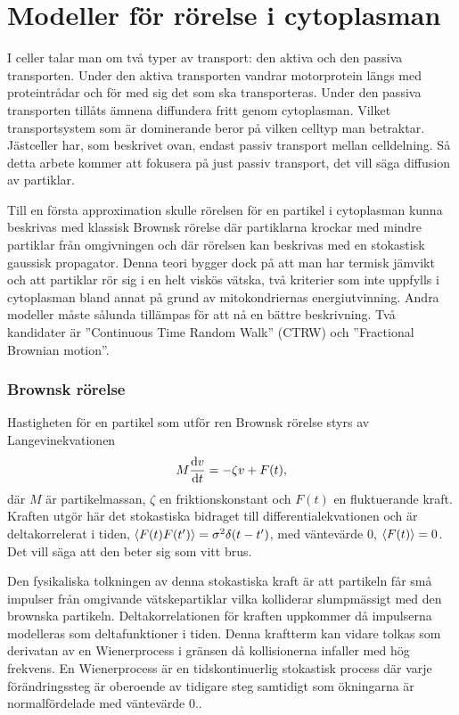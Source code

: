 \section{Modeller för rörelse i cytoplasman}
I celler talar man om två typer av transport: den aktiva och den
passiva transporten. Under den aktiva transporten vandrar motorprotein
längs med proteintrådar och för med sig det som ska transporteras.
Under den passiva transporten tillåts ämnena diffundera fritt genom
cytoplasman. Vilket transportsystem som är dominerande beror på vilken
celltyp man betraktar. Jästceller har, som beskrivet ovan, endast
passiv transport mellan celldelning. Så detta arbete kommer att
fokusera på just passiv transport, det vill säga diffusion av partiklar. 

Till en första approximation skulle rörelsen för en partikel i cytoplasman kunna beskrivas med klassisk Brownsk rörelse där partiklarna krockar med mindre partiklar från omgivningen och där rörelsen kan beskrivas med en stokastisk gaussisk propagator. Denna teori bygger dock på att man har termisk jämvikt och att partiklar rör sig i en helt viskös vätska, två kriterier som inte uppfylls i cytoplasman bland annat på grund av mitokondriernas energiutvinning. Andra modeller måste sålunda tillämpas för att nå en bättre beskrivning. Två kandidater är ''Continuous Time Random Walk'' (CTRW) och ''Fractional Brownian motion''.


\subsubsection{Brownsk rörelse} \label{sec:Brownsk}
Hastigheten för en partikel som utför ren Brownsk rörelse styrs av
Langevinekvationen~\cite{Mazo_Brownian2002} 
\begin{equation} %
    M\dv{v}{t}=-\zeta v + F(t),
\end{equation}
där $M$ är partikelmassan, $\zeta$ en friktionskonstant och $F(t)$ en
fluktuerande kraft. Kraften utgör här det stokastiska bidraget till
differentialekvationen och är deltakorrelerat i tiden,
$\ev{F(t)F(t')}=\sigma^2\delta(t-t')$, 
med väntevärde 0, $\ev{F(t)}=0$. 
Det vill säga att den beter sig som vitt brus. 

Den fysikaliska tolkningen av denna stokastiska kraft är att partikeln får små impulser från omgivande vätskepartiklar vilka kolliderar slumpmässigt med den brownska partikeln.  Deltakorrelationen för kraften uppkommer då impulserna modelleras som deltafunktioner i tiden. Denna kraftterm kan vidare tolkas som derivatan av en Wienerprocess i gränsen då kollisionerna infaller med hög frekvens. En Wienerprocess är en tidskontinuerlig stokastisk process där varje förändringssteg är oberoende av tidigare steg samtidigt som ökningarna är normalfördelade med väntevärde 0..

